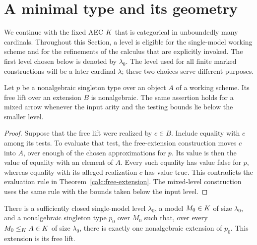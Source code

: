 \section{A minimal type and its geometry}
\label{geom:section-geometry}

We continue with the fixed AEC $K$ that is categorical in unboundedly
many cardinals.  Throughout this Section, a level is eligible for the
single-model working scheme and for the refinements of the calculus
that are explicitly invoked.  The first level chosen below is denoted
by $\lambda_0$.  The level used for all finite marked constructions will
be a later cardinal $\lambda$; these two choices serve different purposes.

\begin{lemma}
\label{geom:nonalgebraic}
Let $p$ be a nonalgebraic singleton type over an object $A$ of a working
scheme.  Its free lift over an extension $B$ is nonalgebraic.  The same
assertion holds for a mixed arrow whenever the input arity and the
testing bounds lie below the smaller level.
\end{lemma}

\begin{proof}
Suppose that the free lift were realized by $c\in B$.  Include equality
with $c$ among its tests.  To evaluate that test, the free-extension
construction moves $c$ into $A$, over enough of the chosen
approximations for $p$.  Its value is then the value of equality with an
element of $A$.  Every such equality has value false for $p$, whereas
equality with its alleged realization $c$ has value true.  This
contradicts the evaluation rule in Theorem~\ref{calc:free-extension}.
The mixed-level construction uses the same rule with the bounds taken
below the input level.
\end{proof}

\begin{proposition}
\label{geom:minimal-type}
There is a sufficiently closed single-model level $\lambda_0$, a model
$M_0\in K$ of size $\lambda_0$, and a nonalgebraic singleton type
$p_0$ over $M_0$ such that, over every $M_0\leq_K A\in K$ of size
$\lambda_0$, there is exactly one nonalgebraic extension of $p_0$.
This extension is its free lift.
\end{proposition}

